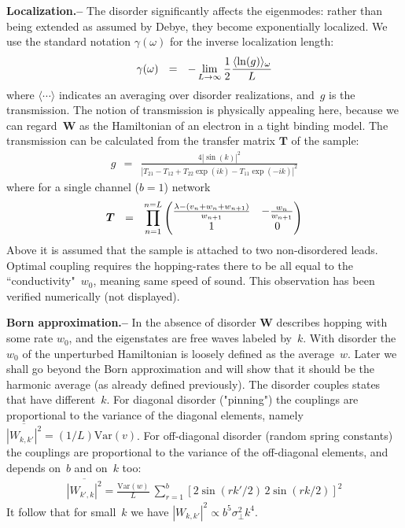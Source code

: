 \documentclass[twocolumn,showpacs,aps,pre]{revtex4-1}
\newcommand{\amatrix}[1]{\begin{matrix} #1 \end{matrix}}
\newcommand{\be}[1]{\begin{eqnarray} \label{e#1}}
\newcommand{\beq}{\begin{eqnarray}}
\newcommand{\eeq}{\end{eqnarray}}
\newcommand{\sect}[1]{{\bf #1.-- }}
\begin{document}
\sect{Localization}
%
The disorder significantly affects the eigenmodes: rather than being extended 
as assumed by Debye, they become exponentially localized. 
We use the standard notation $\gamma(\omega)$ for the inverse localization length: 
%
\beq
\label{locdef}
\gamma(\omega) \ \ = \ \ -\lim_{L\rightarrow \infty}{1\over 2}{\langle \ln(g) \rangle_{\omega} \over L}
\eeq
%
where $\langle\cdots\rangle$ indicates an averaging over disorder realizations, 
and~$g$ is the transmission. The notion of transmission is physically appealing here,  
because we can regard~$\bm{W}$ as the Hamiltonian of an electron in a tight binding model. 
The transmission can be calculated from the transfer matrix $\bm{T}$ of the sample:
%
\beq
\label{gTMM}
g \ \ = \ \ \frac{4|\sin(k)|^2}{|T_{21}-T_{12}+T_{22}\exp(ik)-T_{11}\exp(-ik)|^2}
\eeq
%
where for a single channel ($b=1$) network
%
\be{5}
\bm{T} \ \ = \ \ \prod_{n=1}^{n=L} 
\left(\amatrix{
\frac{\lambda-(v_n + w_{n}+w_{n+1})}{w_{n+1}} & -\frac{w_{n}}{w_{n+1}} \cr 1 & 0 
}\right)
\eeq
%
Above it is assumed that the sample is attached to two non-disordered leads.
Optimal coupling requires the hopping-rates there to be all equal 
to the ``conductivity"~$w_0$, meaning same speed of sound. This observation 
has been verified numerically (not displayed). 

\sect{Born approximation}
%
In the absence of disorder $\bm{W}$ describes hopping 
with some rate $w_0$, and the eigenstates are free waves labeled by~$k$. 
With disorder the~$w_0$ of the unperturbed Hamiltonian is 
loosely defined as the average~$w$. Later we shall go beyond 
the Born approximation and will show that it should 
be the harmonic average (as already defined previously).   
%
The disorder couples states that have different~$k$. 
For diagonal disorder ("pinning") the couplings are proportional to the 
variance of the diagonal elements, 
namely ${ \overline{|W_{k,k'}|^2} = (1/L)\text{Var}(v)}$.
%
For off-diagonal disorder (random spring constants) 
the  couplings are proportional to the variance  of 
the off-diagonal elements, and depends on~$b$ and on~$k$ too:
%
\beq
\overline{\left|W_{k',k}\right|^2}  =  \frac{\text{Var}(w)}{L} \ \sum_{r=1}^{b} \left[2\sin(rk'/2) \, 2\sin(rk/2)\right]^2 
\eeq
%
It follow that for small~$k$ we have ${|W_{k,k'}|^2 \propto b^5 \sigma_{\perp}^2 k^4}$. 
\end{document}

